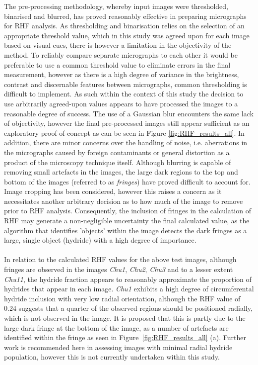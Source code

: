 \documentclass{article}
\begin{document}
    \noindent The pre-processing methodology, whereby input images were thresholded, binarised and blurred, has proved reasonably effective in preparing micrographs for RHF analysis. As thresholding and binarisation relies on the selection of an appropriate threshold value, which in this study was agreed upon for each image based on visual cues, there is however a limitation in the objectivity of the method. To reliably compare separate micrographs to each other it would be preferable to use a common threshold value to eliminate errors in the final measurement, however as there is a high degree of variance in the brightness, contrast and discernable features between micrographs, common thresholding is difficult to implement. As such within the context of this study the decision to use arbitrarily agreed-upon values appears to have processed the images to a reasonable degree of success. The use of a Gaussian blur encounters the same lack of objectivity, however the final pre-processed images still appear sufficient as an exploratory proof-of-concept as can be seen in Figure \ref{fig:RHF_results_all}.
    In addition, there are minor concerns over the handling of noise, i.e. aberrations in the micrographs caused by foreign contaminants or general distortion as a product of the microscopy technique itself. Although blurring is capable of removing small artefacts in the images, the large dark regions to the top and bottom of the images (referred to as \textit{fringes}) have proved difficult to account for. Image cropping has been considered, however this raises a concern as it necessitates another arbitrary decision as to how much of the image to remove prior to RHF analysis. Consequently, the inclusion of fringes in the calculation of RHF may generate a non-negligible uncertainty the final calculated value, as the algorithm that identifies 'objects' within the image detects the dark fringes as a large, single object (hydride) with a high degree of importance.
    \\
    \\
    In relation to the calculated RHF values for the above test images, although fringes are observed in the images \textit{Chu1}, \textit{Chu2}, \textit{Chu3} and to a lesser extent \textit{Chu11}, the hydride fraction appears to reasonably approximate the proportion of hydrides that appear in each image. \textit{Chu1} exhibits a high degree of circumferental hydride inclusion with very low radial orientation, although the RHF value of 0.24 suggests that a quarter of the observed regions should be positioned radially, which is not observed in the image. It is proposed that this is partly due to the large dark fringe at the bottom of the image, as a number of artefacts are identified within the fringe as seen in Figure~\ref{fig:RHF_results_all} (a). Further work is recommended here in assessing images with minimal radial hydride population, however this is not currently undertaken within this study.
\end{document}
